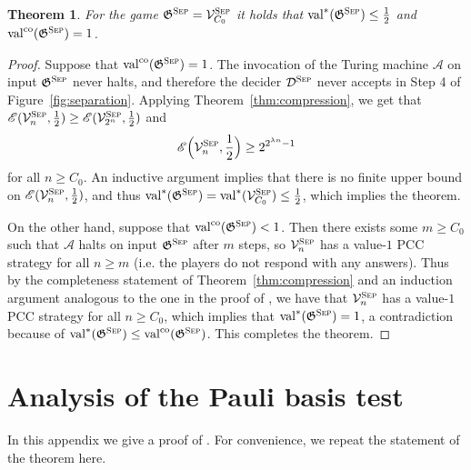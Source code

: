 \documentclass[11pt]{article}
\newtheorem{theorem}{Theorem}[section]
\theoremstyle{definition}
\newcommand{\val}{\ensuremath{\mathrm{val}}}
\newcommand{\valco}{\ensuremath{\mathrm{val}^{\mathrm{co}}}}
\newcommand{\game}{\mathfrak{G}}
\newcommand{\decider}{\mathcal{D}}
\newcommand{\verifier}{\mathcal{V}}
\newcommand{\gamestyle}[1]{\ensuremath{\textsc{#1}}\xspace}
\newcommand{\Ent}{\mathscr{E}}
\renewcommand{\cal}[1]{\mathcal{#1}}
\newcommand{\sep}{\gamestyle{Sep}}
\begin{document}
\begin{theorem}
  \label{thm:separation}
  For the game $\game^\sep = \verifier^\sep_{C_0}$ it holds that
  $\val^*(\game^\sep) \leq \frac{1}{2}$ and $\valco(\game^\sep) = 1$.
\end{theorem}
\begin{proof}
  Suppose that $\valco(\game^\sep) = 1$.
  The invocation of the Turing machine $\cal{A}$ on input $\game^\sep$ never
  halts, and therefore the decider $\decider^\sep$ never accepts in Step 4 of
  Figure~\ref{fig:separation}.
  Applying Theorem~\ref{thm:compression}, we get that
  $\Ent(\verifier^\sep_{n},\frac{1}{2}) \geq
  \Ent(\verifier^\sep_{2^n},\frac{1}{2})$ and
  \begin{equation*}
    \Ent \Bigl( \verifier^\sep_n, \frac{1}{2} \Bigr) \geq 2^{2^{\lambda n}-1}
  \end{equation*}
  for all $n \geq C_0$.
  An inductive argument implies that there is no finite upper bound on
  $\Ent(\verifier^\sep_{n},\frac{1}{2})$, and thus $\val^*(\game^\sep) =
  \val^*(\verifier^\sep_{C_0}) \leq \frac{1}{2}$, which implies the theorem.

  On the other hand, suppose that $\valco(\game^\sep) < 1$.
  Then there exists some $m \geq C_0$ such that $\cal{A}$ halts on input
  $\game^\sep$ after $m$ steps, so $\verifier^\sep_n$ has a value-$1$ PCC
  strategy for all $n \geq m$ (i.e.
  the players do not respond with any answers).
  Thus by the completeness statement of Theorem~\ref{thm:compression} and an
  induction argument analogous to the one in the proof of , we have that $\verifier^\sep_n$ has a value-$1$ PCC
  strategy for all $n \geq C_0$, which implies that $\val^*(\game^\sep) = 1$, a
  contradiction because of $\val^*(\game^\sep) \leq \valco(\game^\sep)$.
  This completes the theorem.
\end{proof}

%
 
\appendix

\newcommand{\ideg}{\mathrm{ideg}}
\newcommand{\Obs}{\mathcal{O}}
\newcommand{\calH}{\mathcal{H}}
\newcommand{\combine}{\mathrm{combine}}
\newcommand{\nqubits}{M}

\section{Analysis of the Pauli basis test}
\label{sec:qld-analysis}
In this appendix we give a proof of . For
convenience, we repeat the statement of the theorem here.
\end{document}
